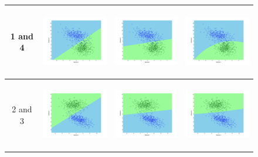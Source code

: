 \documentclass[a4paper]{article}
\begin{document}
\begin{figure}
\begin{tabular}{|c|c|c|c|}
				\hline
				1 and
				4&\includegraphics[width=40mm,height=30mm]{naivebayes/over/pair/14/all_cov.png}&\includegraphics[width=40mm,height=30mm]{naivebayes/over/pair/14/avg_cov.png}
				&\includegraphics[width=40mm,height=30mm]{naivebayes/over/pair/14/diff_cov.png}\\
				\hline
				2 and
				3&\includegraphics[width=40mm,height=30mm]{naivebayes/over/pair/23/all_cov.png}&\includegraphics[width=40mm,height=30mm]{naivebayes/over/pair/23/avg_cov.png}
				&\includegraphics[width=40mm,height=30mm]{naivebayes/over/pair/23/diff_cov.png}\\

\end{tabular}
\end{figure}
\end{document}
